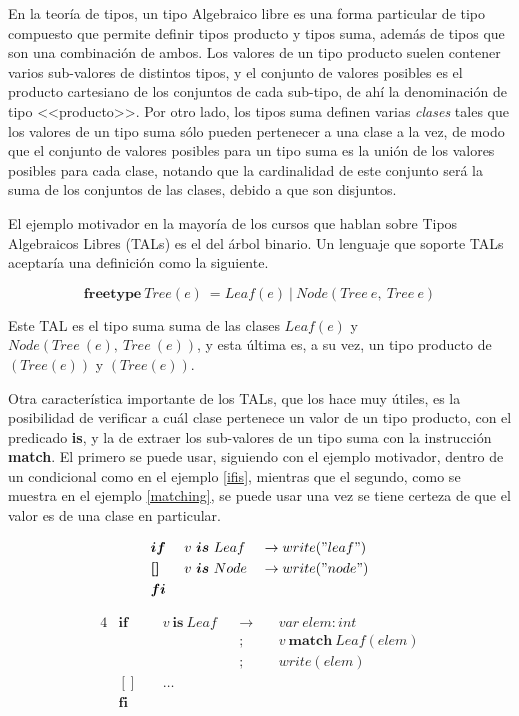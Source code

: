 En la teoría de tipos, un tipo Algebraico libre es una forma particular de tipo
compuesto que permite definir tipos producto y tipos suma, además de tipos que
son una combinación de ambos. Los valores de un tipo producto suelen contener
varios sub-valores de distintos tipos, y el conjunto de valores posibles es el
producto cartesiano de los conjuntos de cada sub-tipo, de ahí la denominación de
tipo <<producto>>. Por otro lado, los tipos suma definen varias \textit{clases}
tales que  los valores de un tipo suma sólo pueden pertenecer a una clase a la
vez, de modo que el conjunto de valores posibles para un tipo suma es la unión
de los valores posibles para cada clase, notando que la cardinalidad de este
conjunto será la suma de los conjuntos de las clases, debido a que son
disjuntos.

El ejemplo motivador en la mayoría de los cursos que hablan sobre Tipos
Algebraicos Libres (TALs) es el del árbol binario. Un lenguaje que soporte TALs
aceptaría una definición como la siguiente.

$$ \textbf{freetype}\ Tree(e)\ = Leaf(e)\ |\ Node(Tree\ e,\ Tree\ e) $$

Este TAL es el tipo suma suma de las clases
$Leaf(e)$ y $Node(Tree\ (e),\ Tree\ (e))$,
y esta última es, a su vez, un tipo producto de $(Tree(e))$ y $(Tree(e))$.

Otra característica importante de los TALs, que los hace muy útiles, es la
posibilidad de verificar a cuál clase pertenece un valor de un tipo producto,
con el predicado \textbf{is}, y la de extraer los sub-valores de un tipo suma
con la instrucción \textbf{match}. El primero se puede usar, siguiendo con el
ejemplo motivador, dentro de un condicional como en el ejemplo \ref{ifis},
mientras que el segundo, como se muestra en el ejemplo \ref{matching}, se puede
usar una vez se tiene certeza de que el valor es de una clase en particular.

\begin{alignat}{3}
&\boldsymbol{if}\ && v\ \boldsymbol{is}\ Leaf && \rightarrow write("leaf") \nonumber \\
&\boldsymbol{[]}\ && v\ \boldsymbol{is}\ Node && \rightarrow write("node") \label{ifis} \\
&\boldsymbol{fi} \nonumber
\end{alignat}

\begin{alignat}{4}
&\boldsymbol{if}\ && v\ \boldsymbol{is}\ Leaf && \rightarrow &&\ var\ elem : int                   \nonumber \\
&                 &&                          &&           ; &&\ v\ \boldsymbol{match}\ Leaf(elem) \nonumber \\
&                 &&                          &&           ; &&\ write (elem)                      \label{matching} \\
&\boldsymbol{[]}\ && \ldots                                                                        \nonumber \\
&\boldsymbol{fi}                                                                                   \nonumber
\end{alignat}

